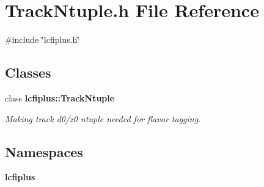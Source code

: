 \section{Track\+Ntuple.\+h File Reference}
\label{TrackNtuple_8h}
{\ttfamily \#include \char`\"{}lcfiplus.\+h\char`\"{}}\newline
\subsection*{Classes}
\begin{DoxyCompactItemize}
\item 
class \textbf{ lcfiplus\+::\+Track\+Ntuple}
\begin{DoxyCompactList}\small\item\em Making track d0/z0 ntuple needed for flavor tagging. \end{DoxyCompactList}\end{DoxyCompactItemize}
\subsection*{Namespaces}
\begin{DoxyCompactItemize}
\item 
 \textbf{ lcfiplus}
\end{DoxyCompactItemize}

